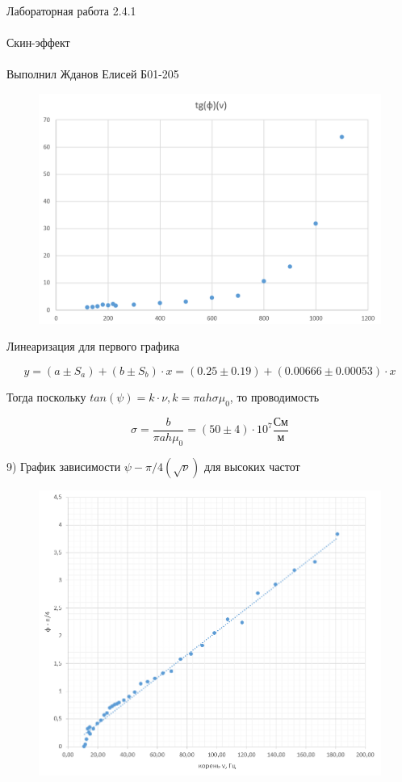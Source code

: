 \documentclass{astroedu-lab}
\begin{document}
\begin{problem}{\huge Лабораторная работа 2.4.1\\\\Скин-эффект\\\\Выполнил Жданов Елисей Б01-205}
\begin{figure}[!h]
	\centering
	\includegraphics[width=1\textwidth]{гр2.png}
	\label{fig:boiler}
\end{figure}

Линеаризация для первого графика

\begin{equation}
	y = (a \pm S_a) + (b \pm S_b) \cdot x = (0.25 \pm 0.19) + (0.00666 \pm 0.00053) \cdot x
\end{equation}

Тогда поскольку $tan(\psi) = k \cdot \nu, k = \pi a h \sigma \mu_0$, то проводимость

\begin{equation}
	\sigma = \frac{b}{\pi a h \mu_0} = (50 \pm 4) \cdot 10^7 \frac{\text{См}}{\text{м}}
\end{equation}

9) График зависимости $\psi - \pi/4(\sqrt{\nu})$ для высоких частот

\newpage

\begin{figure}[!h]
	\centering
	\includegraphics[width=1\textwidth]{гр4.png}
	\label{fig:boiler}
\end{figure}


\end{problem}
\end{document}
